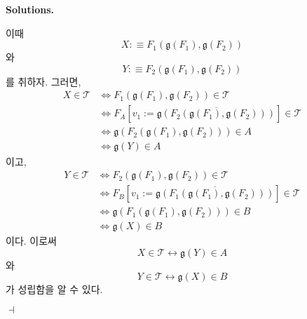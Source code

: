 \documentclass[12pt]{paper}
\newcommand{\gnum}
{ \mathfrak{g}
}
\newenvironment{context}[1][]
{ \noindent \textbf{{#1}.}
}
{ \hfill $ \dashv $
}
\begin{document}
\begin{context}[Solutions]
\begin{enumerate}
      이때 $$X : \equiv F_1 \left( \gnum \left( F_1 \right) , \gnum \left( F_2 \right) \right)$$와 $$Y : \equiv F_2 \left( \gnum \left( F_1 \right) , \gnum \left( F_2 \right) \right)$$를 취하자.
      그러면,
      \begin{align*}
        X \in \mathcal{T}
        & \iff F_1 \left( \gnum \left( F_1 \right) , \gnum \left( F_2 \right) \right) \in \mathcal{T} \\
        & \iff F_A \left[ v_1 := \overline{\gnum \left( F_2 \left( \gnum \left( F_1 \right) , \gnum \left( F_2 \right) \right) \right)} \right] \in \mathcal{T} \\
        & \iff \gnum \left( F_2 \left( \gnum \left( F_1 \right) , \gnum \left( F_2 \right) \right) \right) \in A \\
        & \iff \gnum \left( Y \right) \in A
      \end{align*}
      이고,
      \begin{align*}
        Y \in \mathcal{T}
        & \iff F_2 \left( \gnum \left( F_1 \right) , \gnum \left( F_2 \right) \right) \in \mathcal{T} \\
        & \iff F_B \left[ v_1 := \overline{\gnum \left( F_1 \left( \gnum \left( F_1 \right) , \gnum \left( F_2 \right) \right) \right)} \right] \in \mathcal{T} \\
        & \iff \gnum \left( F_1 \left( \gnum \left( F_1 \right) , \gnum \left( F_2 \right) \right) \right) \in B \\
        & \iff \gnum \left( X \right) \in B
      \end{align*}
      이다.
      이로써 $$X \in \mathcal{T} \leftrightarrow \gnum \left( Y \right) \in A$$와 $$Y \in \mathcal{T} \leftrightarrow \gnum \left( X \right) \in B$$가 성립함을 알 수 있다.
    \end{enumerate}
  \end{context}
\end{document}

